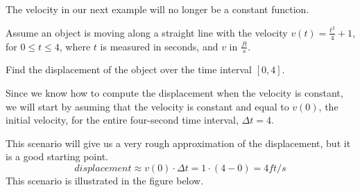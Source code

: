 \documentclass{ximera}
\begin{document}
%
The velocity in our next example will no longer be a constant function.
\begin{example}
Assume an object is moving along a straight line  with the velocity $v(t)=\frac{t^2}{4}+1$, for $0\le t\le4$, where $t$ is measured in seconds, and $v$ in $\frac{ft}{s}$.

  Find the displacement of the object over the time interval $[0,4]$. 
  \begin{explanation}
   Since we know how to compute the displacement when the velocity is constant, we will start by asuming that the velocity is constant and equal to $v(0)$, the initial velocity, for the entire  four-second time interval, $\Delta t=4$. 
   
   This scenario will give us a very rough approximation of the displacement, but it is a good starting point.
  \[
   displacement\approx v(0)\cdot\Delta t=1\cdot(4-0)=4 ft/s
  \]
This scenario is illustrated in the figure below.
 \begin{image}
\end{image}
\end{explanation}
\end{example}
\end{document}
